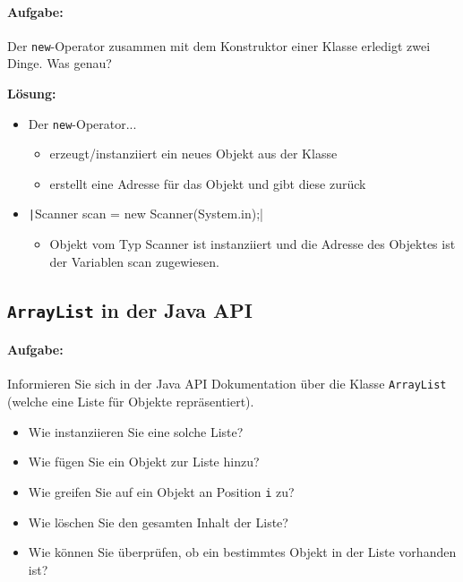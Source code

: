 \documentclass[a4paper,10pt, dvipsnames]{report}
\begin{document}
\paragraph{Aufgabe:} 
Der \texttt{new}-Operator zusammen mit dem Konstruktor einer Klasse erledigt zwei Dinge. Was genau?

\textbf{Lösung:}

\begin{itemize}
    \item Der \texttt{new}-Operator...
    \begin{itemize}
        \item  erzeugt/instanziiert ein neues Objekt aus der Klasse
        \item erstellt eine Adresse für das Objekt und gibt diese zurück
    \end{itemize}
    \item \texttt|Scanner scan = new Scanner(System.in);|
    \begin{itemize}
        \item Objekt vom Typ Scanner ist instanziiert und die Adresse des Objektes ist der Variablen scan zugewiesen.
    \end{itemize}
\end{itemize}

\subsection{\texttt{ArrayList} in der Java API}

\paragraph{Aufgabe:}
Informieren Sie sich in der Java API Dokumentation über die Klasse \texttt{ArrayList} (welche eine Liste für Objekte repräsentiert).

\begin{itemize}
    \item Wie instanziieren Sie eine solche Liste?
    \item Wie fügen Sie ein Objekt zur Liste hinzu?
    \item Wie greifen Sie auf ein Objekt an Position \texttt{i} zu?
    \item Wie löschen Sie den gesamten Inhalt der Liste?
    \item Wie können Sie überprüfen, ob ein bestimmtes Objekt in der Liste vorhanden ist?
\end{itemize}
\end{document}
